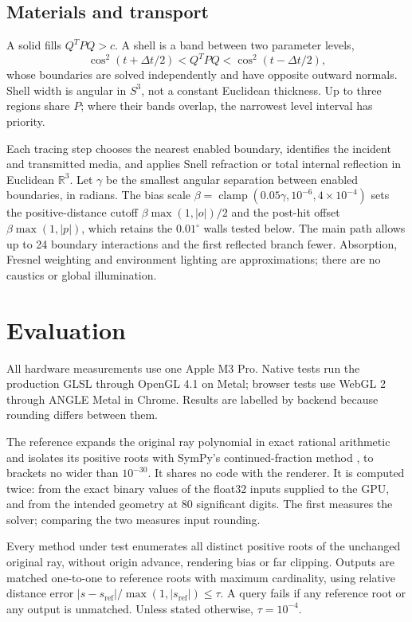 \documentclass{jcgt}
\begin{document}
\subsection{Materials and transport}\label{materials-and-transport}

A solid fills \(Q^TPQ>c\). A shell is a band between two parameter
levels, \[
\cos^2(t+\Delta t/2)<Q^TPQ<\cos^2(t-\Delta t/2),
\] whose boundaries are solved independently and have opposite outward
normals. Shell width is angular in \(S^3\), not a constant Euclidean
thickness. Up to three regions share \(P\); where their bands overlap,
the narrowest level interval has priority.

Each tracing step chooses the nearest enabled boundary, identifies the
incident and transmitted media, and applies Snell refraction or total
internal reflection in Euclidean \(\mathbb R^3\). Let \(\gamma\) be the
smallest angular separation between enabled boundaries, in radians. The
bias scale
\(\beta=\operatorname{clamp}(0.05\gamma,10^{-6},4\times10^{-4})\) sets
the positive-distance cutoff \(\beta\max(1,|o|)/2\) and the post-hit
offset \(\beta\max(1,|p|)\), which retains the \(0.01^\circ\) walls
tested below. The main path allows up to 24 boundary interactions and
the first reflected branch fewer. Absorption, Fresnel weighting and
environment lighting are approximations; there are no caustics or global
illumination.

\section{Evaluation}\label{evaluation}

All hardware measurements use one Apple M3 Pro. Native tests run the
production GLSL through OpenGL 4.1 on Metal; browser tests use WebGL 2
through ANGLE Metal in Chrome. Results are labelled by backend because
rounding differs between them.

The reference expands the original ray polynomial in exact rational
arithmetic and isolates its positive roots with SymPy's
continued-fraction method \citep{meurer2017}, to brackets no wider than
\(10^{-30}\). It shares no code with the renderer. It is computed twice:
from the exact binary values of the float32 inputs supplied to the GPU,
and from the intended geometry at 80 significant digits. The first
measures the solver; comparing the two measures input rounding.

Every method under test enumerates all distinct positive roots of the
unchanged original ray, without origin advance, rendering bias or far
clipping. Outputs are matched one-to-one to reference roots with maximum
cardinality, using relative distance error
\(|s-s_{\mathrm{ref}}|/\max(1,|s_{\mathrm{ref}}|)\le\tau\). A query
fails if any reference root or any output is unmatched. Unless stated
otherwise, \(\tau=10^{-4}\).
\end{document}
